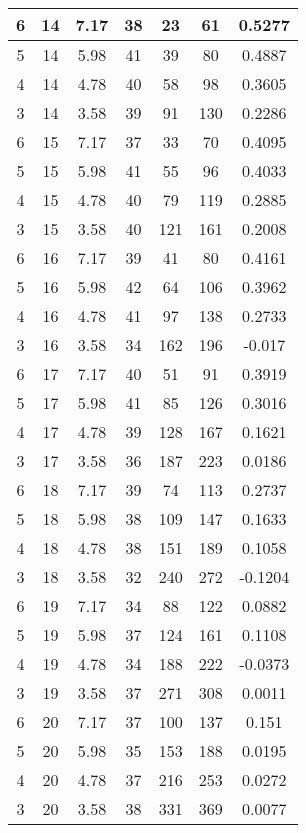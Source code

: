 \documentclass[letterpaper, 12pt]{article}
\begin{document}
\begin{longtable}{|c|c|c|c|c|c|c|}
\hline
6 & 14 & 7.17 & 38 & 23 & 61 & 0.5277 \\
\hline
5 & 14 & 5.98 & 41 & 39 & 80 & 0.4887 \\
\hline
4 & 14 & 4.78 & 40 & 58 & 98 & 0.3605 \\
\hline
3 & 14 & 3.58 & 39 & 91 & 130 & 0.2286 \\
\hline
6 & 15 & 7.17 & 37 & 33 & 70 & 0.4095 \\
\hline
5 & 15 & 5.98 & 41 & 55 & 96 & 0.4033 \\
\hline
4 & 15 & 4.78 & 40 & 79 & 119 & 0.2885 \\
\hline
3 & 15 & 3.58 & 40 & 121 & 161 & 0.2008 \\
\hline
6 & 16 & 7.17 & 39 & 41 & 80 & 0.4161 \\
\hline
5 & 16 & 5.98 & 42 & 64 & 106 & 0.3962 \\
\hline
4 & 16 & 4.78 & 41 & 97 & 138 & 0.2733 \\
\hline
3 & 16 & 3.58 & 34 & 162 & 196 & -0.017 \\
\hline
6 & 17 & 7.17 & 40 & 51 & 91 & 0.3919 \\
\hline
5 & 17 & 5.98 & 41 & 85 & 126 & 0.3016 \\
\hline
4 & 17 & 4.78 & 39 & 128 & 167 & 0.1621 \\
\hline
3 & 17 & 3.58 & 36 & 187 & 223 & 0.0186 \\
\hline
6 & 18 & 7.17 & 39 & 74 & 113 & 0.2737 \\
\hline
5 & 18 & 5.98 & 38 & 109 & 147 & 0.1633 \\
\hline
4 & 18 & 4.78 & 38 & 151 & 189 & 0.1058 \\
\hline
3 & 18 & 3.58 & 32 & 240 & 272 & -0.1204 \\
\hline
6 & 19 & 7.17 & 34 & 88 & 122 & 0.0882 \\
\hline
5 & 19 & 5.98 & 37 & 124 & 161 & 0.1108 \\
\hline
4 & 19 & 4.78 & 34 & 188 & 222 & -0.0373 \\
\hline
3 & 19 & 3.58 & 37 & 271 & 308 & 0.0011 \\
\hline
6 & 20 & 7.17 & 37 & 100 & 137 & 0.151 \\
\hline
5 & 20 & 5.98 & 35 & 153 & 188 & 0.0195 \\
\hline
4 & 20 & 4.78 & 37 & 216 & 253 & 0.0272 \\
\hline
3 & 20 & 3.58 & 38 & 331 & 369 & 0.0077 \\
\hline
\end{longtable}
\end{document}
